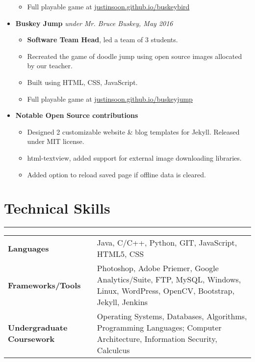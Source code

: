 \documentclass[a4paper]{article}
\begin{document}
\begin{itemize}
\begin{itemize}
		\item Full playable game at \href{http://justinsoon.github.io/BuskeyBird/}{justinsoon.github.io/buskeybird}
	      \end{itemize}
	\item
	      \textbf{Buskey Jump}
	      \hfill \textit{under Mr. Bruce Buskey, May 2016}
	      \begin{itemize}
		\vspace{-2mm} \setlength\itemsep{-0.7mm}
		\item \textbf{Software Team Head}, led a team of 3 students.
		\item Recreated the game of doodle jump using open source images allocated by our teacher.
		\item Built using HTML, CSS, JavaScript.
		\item Full playable game at \href{https://justinsoon.github.io/buskeyjump/}{justinsoon.github.io/buskeyjump}
	      \end{itemize}
	\item
	      \textbf{Notable Open Source contributions}
	      \begin{itemize}
	      	\vspace{-2mm} \setlength\itemsep{-0.7mm}
	      	\item Designed 2 customizable website \& blog templates for Jekyll. Released under MIT license.
	      	\item html-textview, added support for external image downloading libraries.
	      	\item Added option to reload saved page if offline data is cleared.
	      \end{itemize}
\end{itemize}

\section*{Technical Skills}
\hrule
\vspace{3mm}
\begin{tabular}{@{}m{40mm}m{130mm}@{}}
	\textbf{\textrm{Languages}}        & Java, C/C++, Python, GIT, JavaScript, HTML5, CSS\\
	\textbf{\textrm{Frameworks/Tools}} & Photoshop, Adobe Priemer, Google Analytics/Suite, FTP, MySQL, Windows, Linux, WordPress, OpenCV, Bootstrap, Jekyll, Jenkins\\
	\textbf{\textrm{Undergraduate Coursework}} & Operating Systems, Databases, Algorithms, Programming Languages; Computer Architecture, Information Security, Calculcus\\
\end{tabular}
\end{document}
